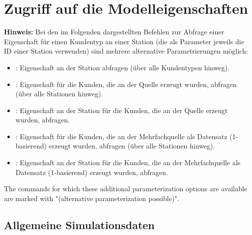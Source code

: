 \chapter{Zugriff auf die Modelleigenschaften}



\textbf{Hinweis:}
Bei den im Folgenden dargestellten Befehlen zur Abfrage einer Eigenschaft für einen Kundentyp an einer Station (die als Parameter jeweils die ID einer Station verwenden) sind mehrere alternative Parametrierungen möglich:

\begin{itemize}
\item
{}: Eigenschaft an der Station  abfragen (über alle Kundentypen hinweg).
\item
{}: Eigenschaft für die Kunden, die an der Quelle  erzeugt wurden, abfragen (über alle Stationen hinweg).
\item
{}: Eigenschaft an der Station  für die Kunden, die an der Quelle  erzeugt wurden, abfragen.
\item
{}: Eigenschaft für die Kunden, die an der Mehrfachquelle  als Datensatz  (1-basierend) erzeugt wurden, abfragen (über alle Stationen hinweg).
\item
{}: Eigenschaft an der Station  für die Kunden, die an der Mehrfachquelle  als Datensatz  (1-basierend) erzeugt wurden, abfragen.
\end{itemize}

The commands for which these additional parameterization options are available are marked with "(alternative parameterization possible)".



\section{Allgemeine Simulationsdaten}

